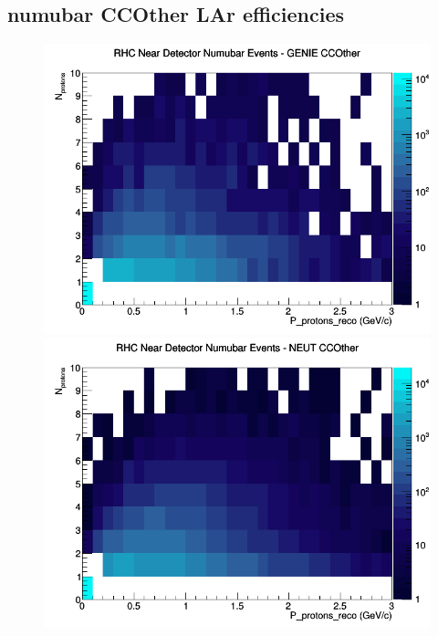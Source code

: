 \subsection{numubar CCOther LAr efficiencies}
\begin{figure}[h]
\includegraphics[width=\linewidth]{eff_N_P/LAr/protons/CCOther_RHC_ND_numubar_N_P_GENIE.png}
\endminipage
{}
\includegraphics[width=\linewidth]{eff_N_P/LAr/protons/CCOther_RHC_ND_numubar_N_P_NEUT.png}
\endminipage
{}

\end{figure}
